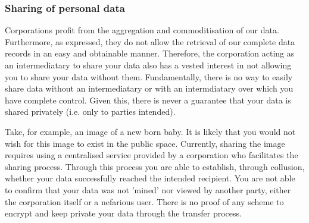\subsubsection{Sharing of personal data}

Corporations profit from the aggregation and commoditisation of our data. Furthermore, as expressed, they do not allow the retrieval of our complete data records in an easy and obtainable manner. Therefore, the corporation acting as an intermediatary to share your data also has a vested interest in not allowing you to share your data without them. Fundamentally, there is no way to easily share data without an intermediatary or with an intermdiatary over which you have complete control. Given this, there is never a guarantee that your data is shared privately (i.e. only to parties intended).

Take, for example, an image of a new born baby. It is likely that you would not wish for this image to exist in the public space. Currently, sharing the image requires using a centralised service provided by a corporation who facilitates the sharing process. Through this process you are able to establish, through collusion, whether your data successfully reached the intended recipient. You are not able to confirm that your data was not 'mined' nor viewed by another party, either the corporation itself or a nefarious user. There is no proof of any scheme to encrypt and keep private your data through the transfer process.
